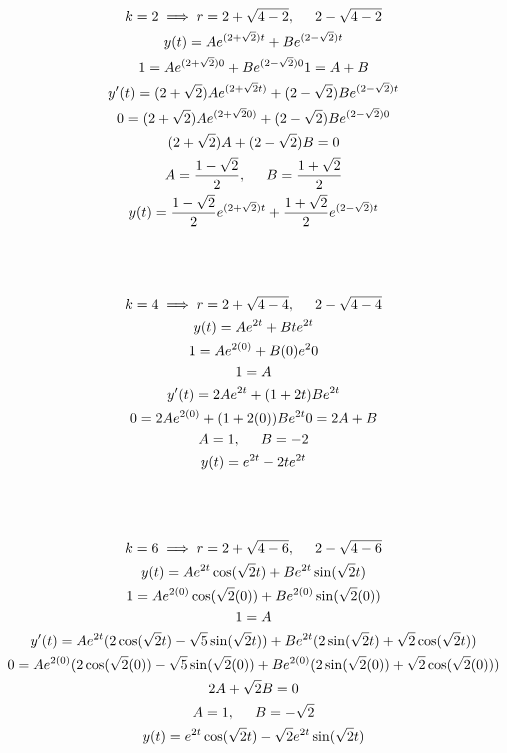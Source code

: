 \documentclass{article}
\begin{document}
    \begin{gather*}
        k = 2 \implies r= 2 + \sqrt{4-2}, \hspace{.5cm}2 - \sqrt{4-2}\\
        y(t) = Ae^{(2+\sqrt{2})t} + Be^{(2-\sqrt{2})t}\\
        1 = Ae^{(2+\sqrt{2})0} + Be^{(2-\sqrt{2})0}
        1 = A + B\\
        y'(t) = (2+\sqrt{2})Ae^{(2+\sqrt{2}t)}+(2-\sqrt{2})Be^{(2-\sqrt{2})t}\\
        0 = (2+\sqrt{2})Ae^{(2+\sqrt{2}0)}+(2-\sqrt{2})Be^{(2-\sqrt{2})0}\\
        (2+\sqrt{2})A + (2-\sqrt{2})B = 0\\
        A = \frac{1-\sqrt{2}}{2},\hspace{.5cm} B = \frac{1+\sqrt{2}}{2}\\
        y(t) = \frac{1-\sqrt{2}}{2}e^{(2+\sqrt{2})t}+ \frac{1+\sqrt{2}}{2}e^{(2-\sqrt{2})t}\\\\\\\\
        k = 4 \implies r= 2 + \sqrt{4-4}, \hspace{.5cm}2 - \sqrt{4-4}\\
        y(t) = Ae^{2t}+Bte^{2t}\\
        1 = Ae^{2(0)}+B(0)e^2{0}\\
        1 = A\\
        y'(t) = 2Ae^{2t}+(1+2t)Be^{2t}\\
        0 = 2Ae^{2(0)}+(1+2(0))Be^{2t}
        0 = 2A + B\\
        A = 1,\hspace{.5cm}B = -2\\
        y(t) = e^{2t}-2te^{2t}\\\\\\\\
        k = 6 \implies r= 2 + \sqrt{4-6}, \hspace{.5cm}2 - \sqrt{4-6}\\
        y(t) = Ae^{2t}\cos(\sqrt{2}t)+Be^{2t}\sin(\sqrt{2}t)\\
        1 = Ae^{2(0)}\cos(\sqrt{2}(0))+Be^{2(0)}\sin(\sqrt{2}(0))\\
        1 = A \\
        y'(t) = Ae^{2t}(2\cos(\sqrt{2}t)-\sqrt{5}\sin(\sqrt{2}t))+Be^{2t}(2\sin(\sqrt{2}t)+\sqrt{2}\cos(\sqrt{2}t))\\
        0 = Ae^{2(0)}(2\cos(\sqrt{2}(0))-\sqrt{5}\sin(\sqrt{2}(0))+Be^{2(0)}(2\sin(\sqrt{2}(0))+\sqrt{2}\cos(\sqrt{2}(0)))\\
        2A+\sqrt{2}B = 0\\
        A = 1, \hspace{.5cm}B = -\sqrt{2}\\
        y(t) = e^{2t}\cos(\sqrt{2}t)-\sqrt{2}e^{2t}\sin(\sqrt{2}t)\\
    \end{gather*}
\end{document}
